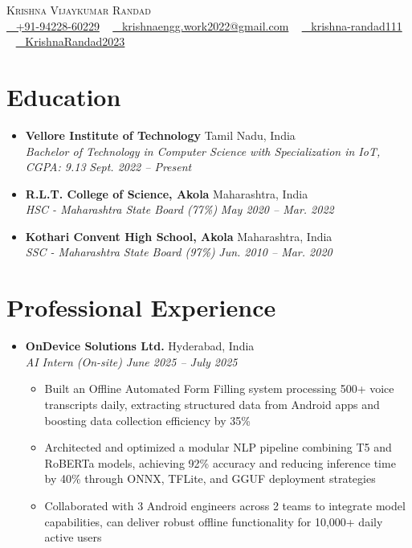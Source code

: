 \documentclass[a4paper,10pt]{article}
\newcommand{\resumeItem}[1]{\item\small{#1}\vspace{2pt}}
\newcommand{\resumeSubheading}[4]{
  \item 
    \textbf{#1} \hfill #2 \\
    \textit{#3} \hfill \textit{#4}\vspace{3pt}
}
\newcommand{\resumeSubHeadingListStart}{\begin{itemize}[leftmargin=0.15in, label={}]}
\newcommand{\resumeSubHeadingListEnd}{\end{itemize}\vspace{1pt}}
\newcommand{\resumeItemListStart}{\begin{itemize}[leftmargin=*]}
\newcommand{\resumeItemListEnd}{\end{itemize}\vspace{-2pt}}
\begin{document}
\begin{center}
    {\Huge \scshape Krishna Vijaykumar Randad} \\ \vspace{8pt}
    \small
    \href{tel:+919422860229}{\faPhone ~ +91-94228-60229} ~
    \href{mailto:krishnaengg.work2022@gmail.com}{\faEnvelope ~ krishnaengg.work2022@gmail.com} ~
    \href{https://linkedin.com/in/krishna-randad111}{\faLinkedinSquare ~ krishna-randad111} ~
    \href{https://github.com/KrishnaRandad2023}{\faGithub ~ KrishnaRandad2023}
\end{center}

\section{Education}
  \resumeSubHeadingListStart
    \resumeSubheading
      {Vellore Institute of Technology}{Tamil Nadu, India}
      {Bachelor of Technology in Computer Science with Specialization in IoT, CGPA: 9.13}{Sept. 2022 -- Present}
    \resumeSubheading
      {R.L.T. College of Science, Akola}{Maharashtra, India}
      {HSC - Maharashtra State Board (77\%)}{May 2020 -- Mar. 2022}
    \resumeSubheading
      {Kothari Convent High School, Akola}{Maharashtra, India}
      {SSC - Maharashtra State Board (97\%)}{Jun. 2010 -- Mar. 2020}
  \resumeSubHeadingListEnd

\section{Professional Experience}
  \resumeSubHeadingListStart

    \resumeSubheading
      {OnDevice Solutions Ltd.}{Hyderabad, India}
      {AI Intern (On-site)}{June 2025 -- July 2025}
      \resumeItemListStart
        \resumeItem{Built an Offline Automated Form Filling system processing 500+ voice transcripts daily, extracting structured data from Android apps and boosting data collection efficiency by 35\%}
        \resumeItem{Architected and optimized a modular NLP pipeline combining T5 and RoBERTa models, achieving 92\% accuracy and reducing inference time by 40\% through ONNX, TFLite, and GGUF deployment strategies}
        \resumeItem{Collaborated with 3 Android engineers across 2 teams to integrate model capabilities, can deliver robust offline functionality for 10,000+ daily active users}
      \resumeItemListEnd

  \resumeSubHeadingListEnd
\end{document}
